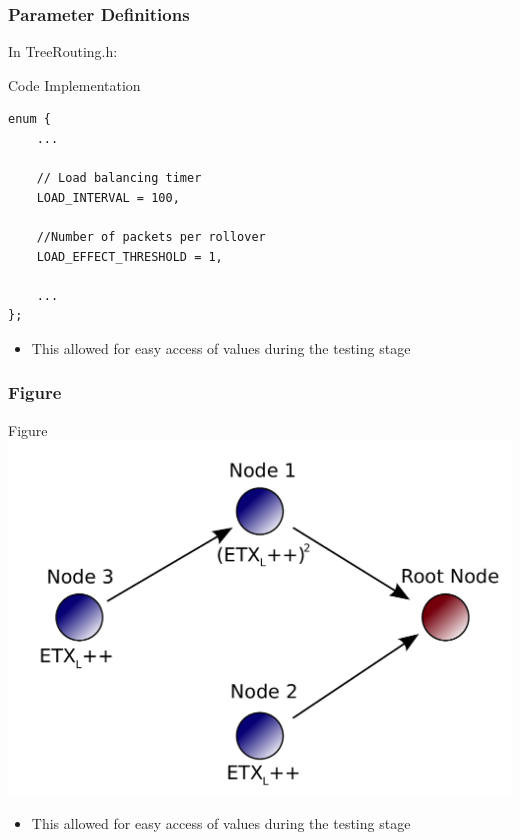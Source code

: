 \documentclass{beamer}
\begin{document}
\begin{frame}[fragile]
  \frametitle{Parameter Definitions}
  In TreeRouting.h:
  \footnotesize{
    \begin{block}{Code Implementation}
      \begin{verbatim}
enum {
    ...

    // Load balancing timer
    LOAD_INTERVAL = 100,        

    //Number of packets per rollover
    LOAD_EFFECT_THRESHOLD = 1, 

    ...
}; 
      \end{verbatim}
    \end{block}

    \begin{itemize}
      \item This allowed for easy access of values during the testing stage
    \end{itemize}
  }
\end{frame}



\begin{frame}[fragile]
  \frametitle{Figure}
  \footnotesize{
    \begin{block}{Figure}
        \includegraphics[width=\textwidth]{Images/Demo_s1}
    \end{block}

    \begin{itemize}
      \item This allowed for easy access of values during the testing stage
    \end{itemize}
  }
\end{frame}
\end{document}
